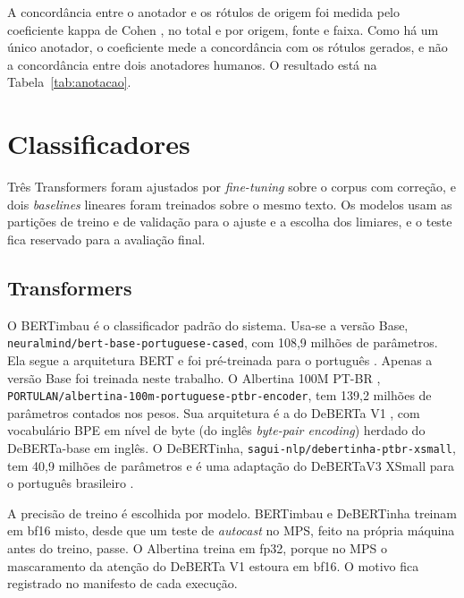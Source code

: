 \documentclass[
    12pt,                %
    openright,           %
    oneside,             %
    a4paper,             %
    english,             %
    brazil               %
]{abntex2}
\begin{document}
A concordância entre o anotador e os rótulos de origem foi medida pelo coeficiente kappa de Cohen \cite{Cohen1960}, no total e por origem, fonte e faixa. Como há um único anotador, o coeficiente mede a concordância com os rótulos gerados, e não a concordância entre dois anotadores humanos. O resultado está na Tabela~\ref{tab:anotacao}.


\section{Classificadores}
\label{sec:classificadores}

Três Transformers foram ajustados por \textit{fine-tuning} sobre o corpus com correção, e dois \textit{baselines} lineares foram treinados sobre o mesmo texto. Os modelos usam as partições de treino e de validação para o ajuste e a escolha dos limiares, e o teste fica reservado para a avaliação final.


\subsection{Transformers}
\label{sec:transformers}

O BERTimbau é o classificador padrão do sistema. Usa-se a versão Base, \texttt{neuralmind/\allowbreak bert-base-\allowbreak portuguese-cased}, com 108,9 milhões de parâmetros. Ela segue a arquitetura BERT \cite{Devlin2019} e foi pré-treinada para o português \cite{Souza2020}. Apenas a versão Base foi treinada neste trabalho. O Albertina 100M PT-BR \cite{Santos2024}, \texttt{PORTULAN/\allowbreak albertina-100m-\allowbreak portuguese-ptbr-encoder}, tem 139,2 milhões de parâmetros contados nos pesos. Sua arquitetura é a do DeBERTa V1 \cite{He2021}, com vocabulário BPE em nível de byte (do inglês \textit{byte-pair encoding}) herdado do DeBERTa-base em inglês. O DeBERTinha, \texttt{sagui-nlp/\allowbreak debertinha-ptbr-\allowbreak xsmall}, tem 40,9 milhões de parâmetros e é uma adaptação do DeBERTaV3 XSmall \cite{He2023} para o português brasileiro \cite{Campiotti2023}.

A precisão de treino é escolhida por modelo. BERTimbau e DeBERTinha treinam em bf16 misto, desde que um teste de \textit{autocast} no MPS, feito na própria máquina antes do treino, passe. O Albertina treina em fp32, porque no MPS o mascaramento da atenção do DeBERTa V1 estoura em bf16. O motivo fica registrado no manifesto de cada execução.
\end{document}
